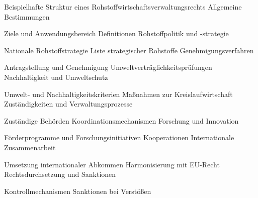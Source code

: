 \documentclass[12pt,a4paper,oneside]{book} %
\begin{document}
Beispielhafte Struktur eines Rohstoffwirtschaftsverwaltungsrechts
Allgemeine Bestimmungen

Ziele und Anwendungsbereich
Definitionen
Rohstoffpolitik und -strategie

Nationale Rohstoffstrategie
Liste strategischer Rohstoffe
Genehmigungsverfahren

Antragstellung und Genehmigung
Umweltverträglichkeitsprüfungen
Nachhaltigkeit und Umweltschutz

Umwelt- und Nachhaltigkeitskriterien
Maßnahmen zur Kreislaufwirtschaft
Zuständigkeiten und Verwaltungsprozesse

Zuständige Behörden
Koordinationsmechanismen
Forschung und Innovation

Förderprogramme und Forschungsinitiativen
Kooperationen
Internationale Zusammenarbeit

Umsetzung internationaler Abkommen
Harmonisierung mit EU-Recht
Rechtsdurchsetzung und Sanktionen

Kontrollmechanismen
Sanktionen bei Verstößen
\end{document}
